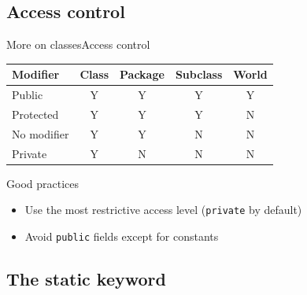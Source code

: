\documentclass[10pt,compress]{beamer} %
\begin{document}
\subsection{Access control}

\begin{frame}[shrink]{More on classes}{Access control}
	\begin{center}
  	\begin{tabular}{|l|c|c|c|c|}
      	\hline
	 Modifier 	& Class & Package & Subclass& World\\ \hline
	 Public 		& Y 	& Y 	  & Y		& Y	\\ \hline
	 Protected 	& Y 	& Y 	  & Y		& N	\\ \hline
	 No modifier & Y 	& Y 	  & N		& N	\\ \hline
	 Private 	& Y 	& N 	  & N		& N	\\ \hline
	 \end{tabular}
	\end{center}

	\vspace{-0.3cm}
	\begin{block}{Good practices}
		\begin{itemize}
		\item Use the most restrictive access level (\texttt{private} by default)
		\item Avoid \texttt{public} fields except for constants
		\end{itemize}
	\end{block}
\end{frame}

\subsection{The static keyword}
\end{document}
